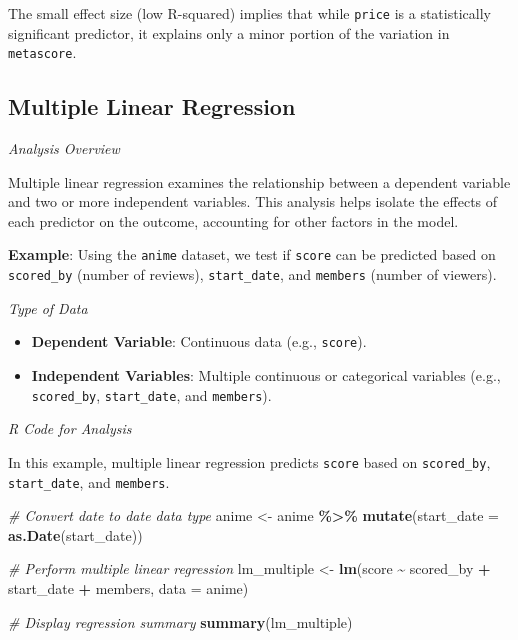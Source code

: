 \documentclass[
]{book}
\newenvironment{Shaded}{\begin{snugshade}}{\end{snugshade}}
\newcommand{\AttributeTok}[1]{\textcolor[rgb]{0.13,0.29,0.53}{#1}}
\newcommand{\CommentTok}[1]{\textcolor[rgb]{0.56,0.35,0.01}{\textit{#1}}}
\newcommand{\FunctionTok}[1]{\textcolor[rgb]{0.13,0.29,0.53}{\textbf{#1}}}
\newcommand{\NormalTok}[1]{#1}
\newcommand{\OtherTok}[1]{\textcolor[rgb]{0.56,0.35,0.01}{#1}}
\newcommand{\SpecialCharTok}[1]{\textcolor[rgb]{0.81,0.36,0.00}{\textbf{#1}}}
\providecommand{\tightlist}{%
  \setlength{\itemsep}{0pt}\setlength{\parskip}{0pt}}
\begin{document}
The small effect size (low R-squared) implies that while \texttt{price} is a statistically significant predictor, it explains only a minor portion of the variation in \texttt{metascore}.

\subsection*{Multiple Linear Regression}\label{multiple-linear-regression}

\emph{Analysis Overview}

Multiple linear regression examines the relationship between a dependent variable and two or more independent variables. This analysis helps isolate the effects of each predictor on the outcome, accounting for other factors in the model.

\textbf{Example}: Using the \texttt{anime} dataset, we test if \texttt{score} can be predicted based on \texttt{scored\_by} (number of reviews), \texttt{start\_date}, and \texttt{members} (number of viewers).

\emph{Type of Data}

\begin{itemize}
\tightlist
\item
  \textbf{Dependent Variable}: Continuous data (e.g., \texttt{score}).
\item
  \textbf{Independent Variables}: Multiple continuous or categorical variables (e.g., \texttt{scored\_by}, \texttt{start\_date}, and \texttt{members}).
\end{itemize}

\emph{R Code for Analysis}

In this example, multiple linear regression predicts \texttt{score} based on \texttt{scored\_by}, \texttt{start\_date}, and \texttt{members}.

\begin{Shaded}
\begin{Highlighting}[]
\CommentTok{\# Convert date to date data type}
\NormalTok{anime }\OtherTok{\textless{}{-}}\NormalTok{ anime }\SpecialCharTok{\%\textgreater{}\%}
  \FunctionTok{mutate}\NormalTok{(}\AttributeTok{start\_date =} \FunctionTok{as.Date}\NormalTok{(start\_date))}

\CommentTok{\# Perform multiple linear regression}
\NormalTok{lm\_multiple }\OtherTok{\textless{}{-}} \FunctionTok{lm}\NormalTok{(score }\SpecialCharTok{\textasciitilde{}}\NormalTok{ scored\_by }\SpecialCharTok{+}\NormalTok{ start\_date }\SpecialCharTok{+}\NormalTok{ members, }\AttributeTok{data =}\NormalTok{ anime)}

\CommentTok{\# Display regression summary}
\FunctionTok{summary}\NormalTok{(lm\_multiple)}
\end{Highlighting}
\end{Shaded}
\end{document}
